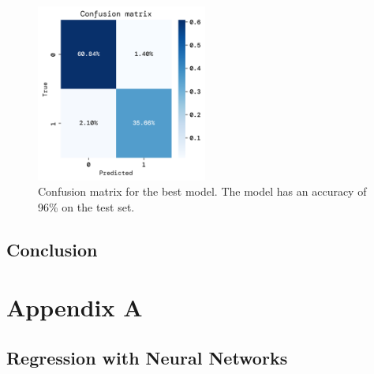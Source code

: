 \documentclass[twoside,11pt]{report}
\begin{document}
\begin{figure}[h]
        \begin{center}
            \includegraphics[width=0.5\textwidth]{../runsAndFigures/confusion_matrix.png}
        \end{center}
        \caption
        {
            Confusion matrix for the best model. 
            The model has an accuracy of 96\% on the test set.
        }\label{fig:confusion_matrix}
\end{figure}



\section{Conclusion}
\label{sec:conclusion}
























\clearpage 

\appendix
\renewcommand{\theHchapter}{appendix\Alph{chapter}}
\renewcommand{\theHsection}{appendix\thesection}

{}


\chapter*{Appendix A}
\label{app:appendixA}


\section{Regression with Neural Networks}
\label{sec:regression}
\end{document}
